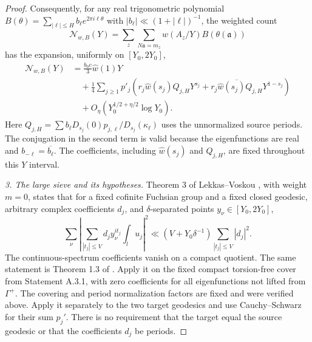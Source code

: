 \begin{proof}
Consequently, for any real trigonometric polynomial
$B(\theta)=\sum_{|\ell|\leq H}b_\ell e^{2\pi i\ell\theta}$
with $|b_\ell|\ll(1+|\ell|)^{-1}$, the weighted count
\[
 \mathcal N_{w,B}(Y)=\sum_z\sum_{N\mathfrak a=m_z}
                  w(A_z/Y)B(\theta(\mathfrak a))
\]
has the expansion, uniformly on $[Y_0,2Y_0]$,
\begin{align}\label{A:sqrt-remainder-expansion}
 \mathcal N_{w,B}(Y)&=\frac{b_0c}{3}\widehat w(1)Y
 \\ &\quad+\frac14\sum_{j\geq1}p'_j
  \left(r_j\widehat w(s_j)Q_{j,H}Y^{s_j}
       +\overline{r_j\widehat w(s_j)Q_{j,H}}Y^{1-s_j}\right)
 \\ &\quad+O_\eta\left(Y_0^{1/2+\eta/2}\log Y_0\right).
 \nonumber
\end{align}
Here $Q_{j,H}=\sum b_\ell D_{s_j}(0)
p_{j,\ell}/D_{s_j}(\kappa_\ell)$ uses the unnormalized source
periods. The conjugation in the second term is valid because
the eigenfunctions are real and $b_{-\ell}=\overline{b_\ell}$.
The coefficients, including $\widehat w(s_j)$ and $Q_{j,H}$,
are fixed throughout this $Y$ interval.

\emph{3. The large sieve and its hypotheses.}
Theorem 3 of Lekkas--Voskou \cite{LekkasVoskou2024}, with weight
$m=0$, states that for a fixed cofinite Fuchsian group and a
fixed closed geodesic, arbitrary complex coefficients $d_j$, and
$\delta$-separated points $y_\nu\in[Y_0,2Y_0]$,
\[
 \sum_\nu\left|\sum_{|t_j|\leq V}d_jy_\nu^{it_j}
                    \int_lu_j\right|^2
 \ll (V+Y_0\delta^{-1})\sum_{|t_j|\leq V}|d_j|^2.
\]
The continuous-spectrum coefficients vanish on a compact quotient.
The same statement is Theorem 1.3 of \cite{LekkasPetridis2026}.
Apply it on the fixed compact torsion-free cover from Statement A.3.1,
with zero coefficients for all eigenfunctions not lifted from
$\Gamma^+$. The covering and period normalization factors are
fixed and were verified above. Apply it separately to the two
target geodesics and use Cauchy--Schwarz for their sum $p_j'$.
There is no requirement that the target equal the source geodesic
or that the coefficients $d_j$ be periods.


\end{proof}
